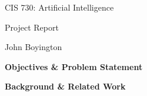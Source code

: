 \documentclass{amsart}
\theoremstyle{definition}
\begin{document}
\LARGE{CIS 730: Artificial Intelligence}
 
\large
Project Report
 
John Boyington
\newline
\bigskip












\textbf{Objectives \& Problem Statement}












\textbf{Background \& Related Work}

\end{document}
